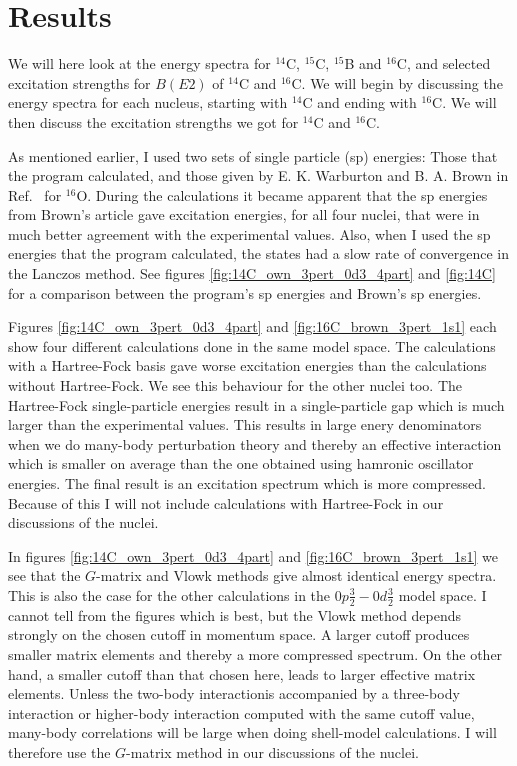 \chapter{Results}

We will here look at the energy spectra for $^{14}$C, $^{15}$C, $^{15}$B and
$^{16}$C, and selected  excitation strengths for $B(E2)$ of $^{14}$C and $^{16}$C. We will begin
by discussing the energy spectra for each nucleus, starting with $^{14}$C and
ending with $^{16}$C. We will then discuss the excitation strengths we got for
$^{14}$C and $^{16}$C.

As mentioned earlier, I used two sets of single particle (sp) energies: Those
that the program calculated, and those given by E. K. Warburton
and B. A. Brown in Ref.~\citep{brown} for $^{16}$O. During the calculations it became
apparent that the sp energies from Brown's article gave excitation energies,
for all four nuclei, that were in much better agreement with the experimental
values. Also, when I used the sp energies that the program calculated, the
states had a slow rate of convergence in the Lanczos method. See figures
\ref{fig:14C_own_3pert_0d3_4part} and \ref{fig:14C} for a comparison between
the program's sp energies and Brown's sp energies.

Figures \ref{fig:14C_own_3pert_0d3_4part} and \ref{fig:16C_brown_3pert_1s1}
each show four different calculations done in the same model space. The
calculations with a Hartree-Fock basis gave worse excitation energies than the
calculations without Hartree-Fock. We see this behaviour for the other
nuclei too. The Hartree-Fock single-particle energies result in a single-particle gap which is much larger than the experimental values. This results in large enery denominators when we do many-body perturbation theory and thereby an effective interaction which is smaller on average than the one obtained using hamronic oscillator energies.
The final result is an excitation spectrum which is more compressed.
Because of this I will not include calculations with
Hartree-Fock in our discussions of the nuclei.

In figures \ref{fig:14C_own_3pert_0d3_4part} and \ref{fig:16C_brown_3pert_1s1}
we see that the $G$-matrix and Vlowk methods give almost identical energy
spectra. This is also the case for the other calculations in the
$0p\frac32-0d\frac32$ model space. I cannot tell from the figures which is
best, but the Vlowk method depends strongly on the chosen cutoff in momentum space. 
A larger  cutoff produces smaller matrix elements and thereby a more compressed spectrum.
On the other hand, a smaller cutoff than that chosen here, leads to larger effective matrix elements.  
Unless the two-body interactionis accompanied by a three-body interaction or higher-body interaction computed with the 
same cutoff value,  many-body correlations will be large when doing shell-model calculations. 
I will therefore use the $G$-matrix method in our
discussions of the nuclei.

